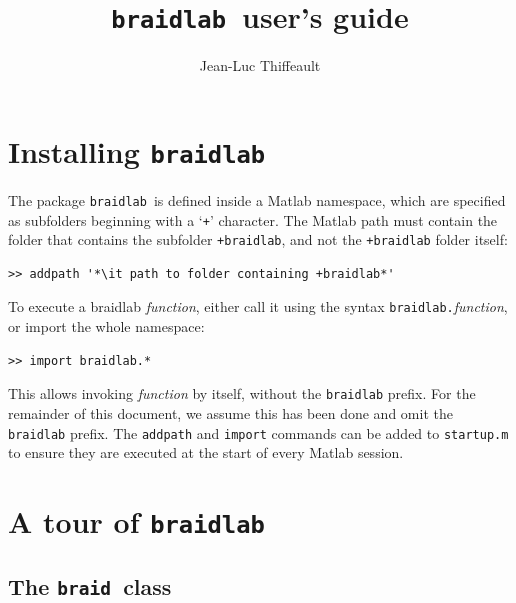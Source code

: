 \documentclass[12pt]{article}
\newcommand{\braidlab}{\texttt{braidlab}}%
\newcommand{\braid}{\texttt{braid}}%
\begin{document}
\lstset{language=Matlab}
\lstset{breaklines=true}

\lstset{%
basicstyle=\small\ttfamily,
keywordstyle=\small\ttfamily,
identifierstyle=,
commentstyle=\small\rmfamily\itshape,%
stringstyle=\small\ttfamily,
showstringspaces=false}


\title{\braidlab\ user's guide}
\author{Jean-Luc Thiffeault}
\date{}
\maketitle

\section{Installing \braidlab}

The package \braidlab\ is defined inside a Matlab namespace, which are
specified as subfolders beginning with a `\lstinline{+}' character.  The Matlab
path must contain the folder that contains the subfolder
\lstinline{+braidlab}, and not the \lstinline{+braidlab} folder
itself:
\begin{lstlisting}[frame=single,framerule=0pt,escapechar=*]
>> addpath '*\it path to folder containing +braidlab*'
\end{lstlisting}
To execute a braidlab \textit{function}, either call it using the
syntax \hbox{\lstinline{braidlab.}\textit{function}}, or import the
whole namespace:
\begin{lstlisting}[frame=single,framerule=0pt]
>> import braidlab.*
\end{lstlisting}
This allows invoking \textit{function} by itself, without the
\lstinline{braidlab} prefix.  For the remainder of this document, we
assume this has been done and omit the \lstinline{braidlab} prefix.
The \lstinline{addpath} and \lstinline{import} commands can be added
to \lstinline{startup.m} to ensure they are executed at the start of
every Matlab session.


\section{A tour of \braidlab}
\label{sec:tour}

\subsection{The \braid\ class}
\label{sec:braidclass}
\end{document}

